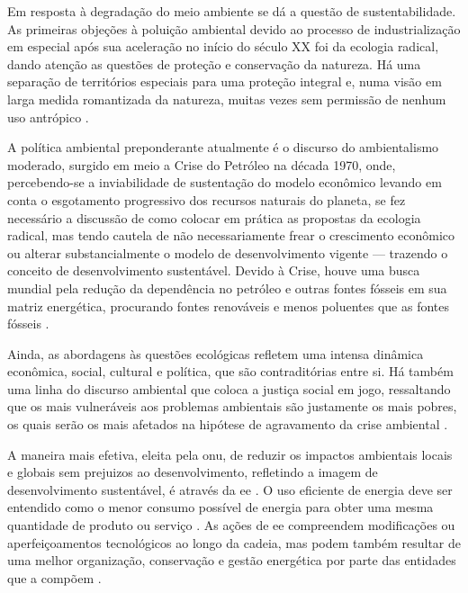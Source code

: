 Em resposta à degradação do meio ambiente se dá a questão de
sustentabilidade. As primeiras objeções à poluição ambiental devido ao processo 
de industrialização em especial após sua aceleração no início do século XX
foi da ecologia radical, dando atenção as questões de proteção e conservação da natureza.
Há uma separação de territórios especiais para uma proteção integral e, numa
visão em larga medida romantizada da natureza, muitas vezes sem permissão 
de nenhum uso antrópico \cite{jatoba}.

A política ambiental preponderante atualmente é o discurso do ambientalismo moderado, 
surgido em meio a Crise do Petróleo na década 1970, onde, percebendo-se a
inviabilidade de sustentação do modelo econômico levando em conta o esgotamento
progressivo dos recursos naturais do planeta, se fez necessário a discussão de como 
colocar em prática as propostas da ecologia radical, mas tendo cautela de não 
necessariamente frear o crescimento econômico ou alterar substancialmente o 
modelo de desenvolvimento vigente --- trazendo o conceito de desenvolvimento
sustentável. Devido à Crise, houve uma busca mundial pela redução da 
dependência no petróleo e outras fontes fósseis em sua matriz energética, 
procurando fontes renováveis e menos poluentes que as fontes fósseis 
\cite{jatoba,epe_eficiencia_2012,rippel}. 

Ainda, as abordagens às questões ecológicas refletem uma intensa dinâmica
econômica, social, cultural e política, que são contraditórias entre si.
Há também uma linha do discurso ambiental que coloca a
justiça social em jogo, ressaltando que os mais vulneráveis aos problemas
ambientais são justamente os mais pobres, os quais serão os mais afetados na
hipótese de agravamento da crise ambiental \cite{jatoba}.

A maneira mais efetiva, eleita pela \gls{onu}, de reduzir 
os impactos ambientais locais e globais sem prejuizos ao desenvolvimento, 
refletindo a imagem de desenvolvimento sustentável, é através da \gls{ee}
\cite{rippel,onu,dissert_cursino}.  O uso eficiente de energia deve ser entendido como 
o menor consumo possível de energia para obter uma mesma 
quantidade de produto ou serviço \cite{pne30_eff_energ}. 
As ações de \gls{ee} compreendem modificações ou aperfeiçoamentos tecnológicos ao longo
da cadeia, mas podem também resultar de uma melhor organização, conservação e
gestão energética por parte das entidades que a compõem \cite{pnef}. 

